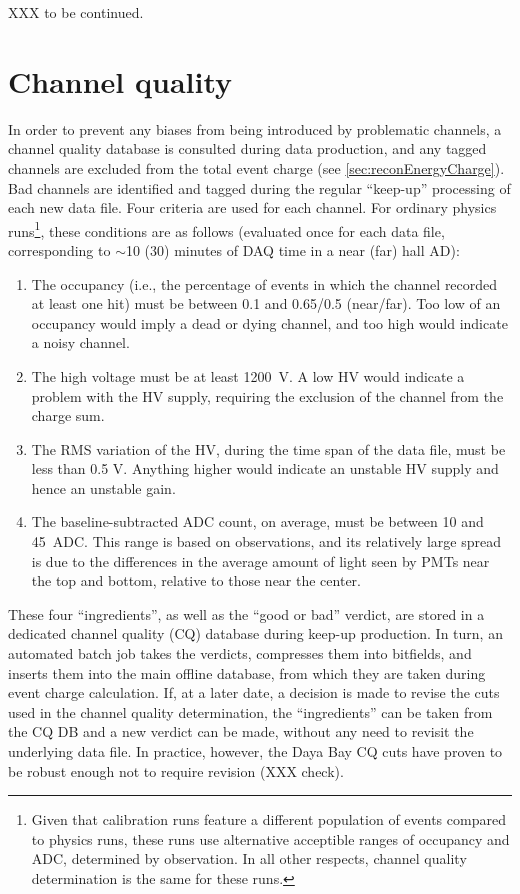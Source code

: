 \documentclass[../thesis.tex]{subfiles}
\begin{document}
XXX to be continued.

\section{Channel quality}
\label{sec:calibCQ}

In order to prevent any biases from being introduced by problematic channels, a channel quality database is consulted during data production, and any tagged channels are excluded from the total event charge (see \autoref{sec:reconEnergyCharge}). Bad channels are identified and tagged during the regular ``keep-up'' processing of each new data file. Four criteria are used for each channel. For ordinary physics runs\footnote{Given that calibration runs feature a different population of events compared to physics runs, these runs use alternative acceptible ranges of occupancy and ADC, determined by observation. In all other respects, channel quality determination is the same for these runs.}, these conditions are as follows (evaluated once for each data file, corresponding to $\sim$10 (30) minutes of DAQ time in a near (far) hall AD):

\begin{enumerate}
\item The occupancy (i.e., the percentage of events in which the channel recorded at least one hit) must be between 0.1 and 0.65/0.5 (near/far). Too low of an occupancy would imply a dead or dying channel, and too high would indicate a noisy channel.
\item The high voltage must be at least 1200~V. A low HV would indicate a problem with the HV supply, requiring the exclusion of the channel from the charge sum.
\item The RMS variation of the HV, during the time span of the data file, must be less than 0.5 V. Anything higher would indicate an unstable HV supply and hence an unstable gain.
\item The baseline-subtracted ADC count, on average, must be between 10 and 45~ADC. This range is based on observations, and its relatively large spread is due to the differences in the average amount of light seen by PMTs near the top and bottom, relative to those near the center.
\end{enumerate}

These four ``ingredients'', as well as the ``good or bad'' verdict, are stored in a dedicated channel quality (CQ) database during keep-up production. In turn, an automated batch job takes the verdicts, compresses them into bitfields, and inserts them into the main offline database, from which they are taken during event charge calculation. If, at a later date, a decision is made to revise the cuts used in the channel quality determination, the ``ingredients'' can be taken from the CQ DB and a new verdict can be made, without any need to revisit the underlying data file. In practice, however, the Daya Bay CQ cuts have proven to be robust enough not to require revision (XXX check).

\subfilebackmatter
\end{document}

